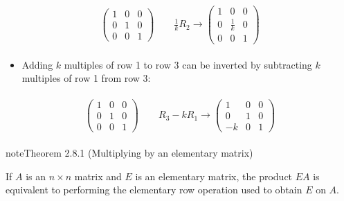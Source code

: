 \documentclass[letterpaper,10pt,english]{jupyterBook}
\begin{document}
\begin{equation*}
\begin{split} \begin{align*}
    \begin{pmatrix} 1 & 0 & 0 \\ 0 & 1 & 0 \\ 0 & 0 & 1 \end{pmatrix}
    \qquad \frac{1}{k} R_2  \longrightarrow
    \begin{pmatrix} 1 & 0 & 0 \\ 0 & \frac{1}{k} & 0 \\ 0 & 0 & 1 \end{pmatrix}
\end{align*} \end{split}
\end{equation*}\begin{itemize}
\item {} 
\sphinxAtStartPar
Adding \(k\) multiples of row 1 to row 3 can be inverted by subtracting \(k\) multiples of row 1 from row 3:

\end{itemize}
\begin{equation*}
\begin{split} \begin{align*}
    \begin{pmatrix} 1 & 0 & 0 \\ 0 & 1 & 0 \\ 0 & 0 & 1 \end{pmatrix}
    \qquad R_3 - kR_1 \longrightarrow
    \begin{pmatrix} 1 & 0 & 0 \\ 0 & 1 & 0 \\ -k & 0 & 1 \end{pmatrix}
\end{align*} \end{split}
\end{equation*}\label{_pages/2.5_Gauss_Jordan_elimination:elementary-matrix-multiplication-theorem}
\begin{sphinxadmonition}{note}{Theorem 2.8.1 (Multiplying by an elementary matrix)}



\sphinxAtStartPar
If \(A\) is an \(n \times n\) matrix and \(E\) is an elementary matrix, the product \(EA\) is equivalent to performing the elementary row operation used to obtain \(E\) on \(A\).
\end{sphinxadmonition}
\end{document}
